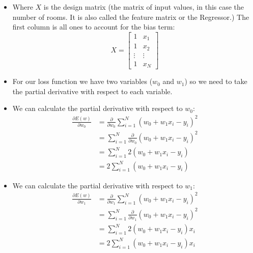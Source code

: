 \documentclass[12pt]{article}
\begin{document}
\begin{itemize}
\begin{itemize}
                        \item Where $X$ is the design matrix (the matrix of input values, in this case the number of rooms. It is also called the feature matrix or the Regressor.) The first column is all ones to account for the bias term:
                        \begin{equation}
                            X = \begin{bmatrix}
                                1 & x_1\\
                                1 & x_2\\
                                \vdots & \vdots\\
                                1 & x_N
                            \end{bmatrix}
                        \end{equation}
                        \item For our loss function we have two variables ($w_0$ and $w_1$) so we need to take the partial derivative with respect to each variable.
                        \item We can calculate the partial derivative with respect to $w_0$:
                        \begin{align*}
                            \frac{\partial E(w)}{\partial w_0} &= \frac{\partial}{\partial w_0} \sum_{i=1}^N {(w_0 + w_1x_i - y_i)}^2\\
                            &= \sum_{i=1}^N \frac{\partial}{\partial w_0} {(w_0 + w_1x_i - y_i)}^2\\
                            &= \sum_{i=1}^N 2(w_0 + w_1x_i - y_i)\\
                            &= 2 \sum_{i=1}^N (w_0 + w_1x_i - y_i)
                        \end{align*}
                        \item We can calculate the partial derivative with respect to $w_1$:
                        \begin{align*}
                            \frac{\partial E(w)}{\partial w_1} &= \frac{\partial}{\partial w_1} \sum_{i=1}^N {(w_0 + w_1x_i - y_i)}^2\\
                            &= \sum_{i=1}^N \frac{\partial}{\partial w_1} {(w_0 + w_1x_i - y_i)}^2\\
                            &= \sum_{i=1}^N 2(w_0 + w_1x_i - y_i)x_i\\
                            &= 2 \sum_{i=1}^N (w_0 + w_1x_i - y_i)x_i
                        \end{align*}

\end{itemize}
\end{itemize}
\end{document}
